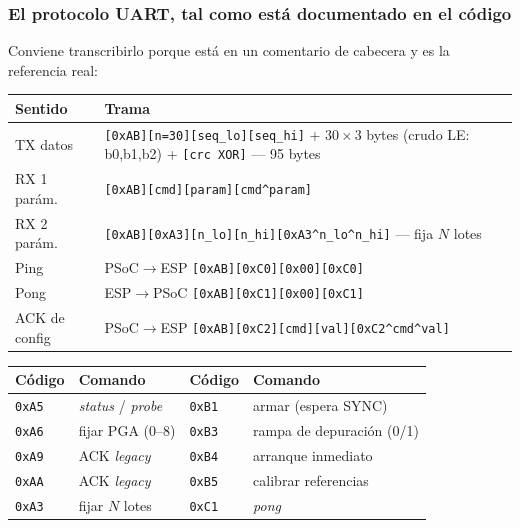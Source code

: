 
\subsubsection{El protocolo UART, tal como est\'a documentado en el c\'odigo}

Conviene transcribirlo porque est\'a en un comentario de cabecera y es la
referencia real:

\begin{center}\footnotesize
\begin{tabularx}{\textwidth}{@{}l X@{}}
\toprule
Sentido & Trama \\
\midrule
TX datos & \texttt{[0xAB][n=30][seq\_lo][seq\_hi]} + $30\times3$ bytes (crudo LE: b0,b1,b2) + \texttt{[crc XOR]} --- 95 bytes \\
RX 1 par\'am. & \texttt{[0xAB][cmd][param][cmd\^{}param]} \\
RX 2 par\'am. & \texttt{[0xAB][0xA3][n\_lo][n\_hi][0xA3\^{}n\_lo\^{}n\_hi]} --- fija $N$ lotes \\
Ping & PSoC$\to$ESP \texttt{[0xAB][0xC0][0x00][0xC0]} \\
Pong & ESP$\to$PSoC \texttt{[0xAB][0xC1][0x00][0xC1]} \\
ACK de config & PSoC$\to$ESP \texttt{[0xAB][0xC2][cmd][val][0xC2\^{}cmd\^{}val]} \\
\bottomrule
\end{tabularx}
\end{center}

\begin{center}\footnotesize
\begin{tabular}{@{}ll ll@{}}
\toprule
C\'odigo & Comando & C\'odigo & Comando \\
\midrule
\texttt{0xA5} & \emph{status} / \emph{probe} & \texttt{0xB1} & armar (espera SYNC) \\
\texttt{0xA6} & fijar PGA (0--8)            & \texttt{0xB3} & rampa de depuraci\'on (0/1) \\
\texttt{0xA9} & ACK \emph{legacy}           & \texttt{0xB4} & arranque inmediato \\
\texttt{0xAA} & ACK \emph{legacy}           & \texttt{0xB5} & calibrar referencias \\
\texttt{0xA3} & fijar $N$ lotes             & \texttt{0xC1} & \emph{pong} \\
\bottomrule
\end{tabular}
\end{center}

